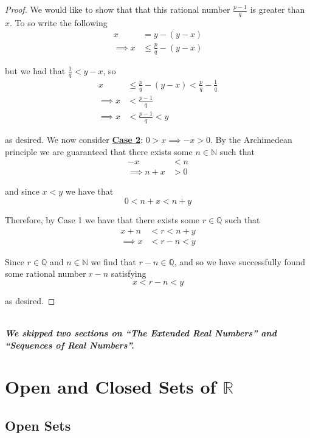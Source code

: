 \documentclass[12pt]{article}
\newlength\tindent
\renewcommand{\indent}{\hspace*{\tindent}}
\newcommand{\R}{\mathbb R}
\newcommand{\N}{\mathbb N}
\newcommand{\Q}{\mathbb Q}
\begin{document}
\begin{proof}
\indent We would like to show that that this rational number $\frac{p - 1}{q}$ is greater than $x$. To so write the following
\begin{align*}
	x &= y - (y - x) \\
	\implies x &\leq \frac{p}{q} - (y - x)
\end{align*}

but we had that $\frac{1}{q} < y - x$, so
\begin{align*}
	x &\leq \frac{p}{q} - (y - x) < \frac{p}{q} - \frac{1}{q} \\
	\implies x &< \frac{p - 1}{q} \\
	\implies x &< \frac{p - 1}{q} < y
\end{align*}

as desired. We now consider {\bf \underline{Case 2}}: $0 > x \implies -x > 0$. By the Archimedean principle we are guaranteed that there exists some $n \in \N$ such that 
\begin{align*}
	-x &< n \\
	\implies n + x &> 0 
\end{align*}

and since $x < y$ we have that
\begin{equation*}
	0 < n + x < n + y
\end{equation*}

Therefore, by Case 1 we have that there exists some $r \in \Q$ such that
\begin{align*}
	x + n &< r < n + y \\
	\implies x &< r - n < y
\end{align*}

\indent Since $r \in \Q$ and $n \in \N$ we find that $r - n \in \Q$, and so we have successfully found some rational number $r - n$ satisfying
\begin{equation*}
	x < r - n < y
\end{equation*}

as desired.
\end{proof} \hfill\\

{\bf \em \indent We skipped two sections on ``The Extended Real Numbers'' and ``Sequences of Real Numbers''.}

\section{Open and Closed Sets of $\bm{\R}$}

\subsection{Open Sets}
\end{document}
